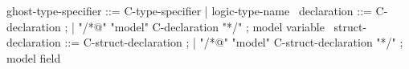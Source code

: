 \begin{syntax}

  ghost-type-specifier ::= C-type-specifier | {logic-type-name} \
  declaration ::= C-declaration ;
  | "/*@" "model" C-declaration "*/" ; model variable
  \
  struct-declaration ::= C-struct-declaration ;
  | "/*@" "model" C-struct-declaration "*/" ; model field
\end{syntax}

